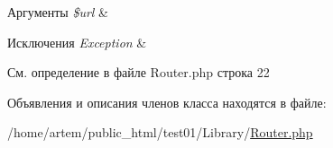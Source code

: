 \begin{DoxyParams}{Аргументы}
{\em \$url} & \\
\hline
\end{DoxyParams}

\begin{DoxyExceptions}{Исключения}
{\em Exception} & \\
\hline
\end{DoxyExceptions}


См. определение в файле Router.\-php строка 22



Объявления и описания членов класса находятся в файле\-:\begin{DoxyCompactItemize}
\item 
/home/artem/public\-\_\-html/test01/\-Library/\hyperlink{_router_8php}{Router.\-php}\end{DoxyCompactItemize}
